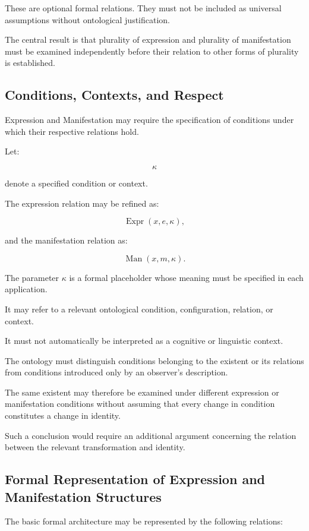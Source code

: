 These are optional formal
relations. They must not
be included as universal
assumptions without
ontological justification.

The central result is that
plurality of expression
and plurality of manifestation
must be examined independently
before their relation to
other forms of plurality
is established.

\subsection{Conditions, Contexts, and Respect}

Expression and Manifestation
may require the specification
of conditions under which
their respective relations
hold.

Let:

\[
    \kappa
\]

denote a specified condition
or context.

The expression relation
may be refined as:

\[
    \operatorname{Expr}(x,e,\kappa),
\]

and the manifestation relation
as:

\[
    \operatorname{Man}(x,m,\kappa).
\]

The parameter \(\kappa\)
is a formal placeholder
whose meaning must be
specified in each application.

It may refer to a relevant
ontological condition,
configuration, relation,
or context.

It must not automatically
be interpreted as a cognitive
or linguistic context.

The ontology must distinguish
conditions belonging to
the existent or its relations
from conditions introduced
only by an observer's
description.

The same existent may
therefore be examined
under different expression
or manifestation conditions
without assuming that every
change in condition constitutes
a change in identity.

Such a conclusion would
require an additional
argument concerning the
relation between the
relevant transformation
and identity.

\subsection{Formal Representation of Expression and Manifestation Structures}

The basic formal architecture
may be represented by
the following relations:


